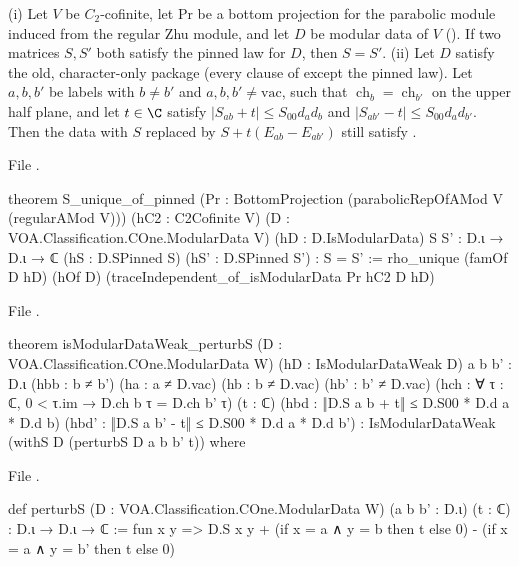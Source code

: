 \begin{theorem}\label{l21:thm:spin}
(i) Let $V$ be $C_2$-cofinite, let $\mathrm{Pr}$ be a bottom projection for the parabolic module induced from the
regular Zhu module, and let $D$ be modular data of $V$ (). If two matrices $S,S'$ both satisfy the
pinned law for $D$, then $S=S'$.
(ii) Let $D$ satisfy the old, character-only package  (every clause of 
except the pinned law). Let $a,b,b'$ be labels with $b\ne b'$ and $a,b,b'\ne\mathrm{vac}$, such that
$\operatorname{ch}_b=\operatorname{ch}_{b'}$ on the upper half plane, and let $t\in\C$ satisfy
$|S_{ab}+t|\le S_{00}d_ad_b$ and $|S_{ab'}-t|\le S_{00}d_ad_{b'}$. Then the data with $S$ replaced by
$S+t(E_{ab}-E_{ab'})$ still satisfy .
\end{theorem}
\noindent File .
\begin{leancode}
theorem S_unique_of_pinned
    (Pr : BottomProjection (parabolicRepOfAMod V (regularAMod V)))
    (hC2 : C2Cofinite V) (D : VOA.Classification.COne.ModularData V) (hD : D.IsModularData)
    {S S' : D.ι → D.ι → ℂ} (hS : D.SPinned S) (hS' : D.SPinned S') : S = S' :=
  rho_unique (famOf D hD) (hOf D) (traceIndependent_of_isModularData Pr hC2 D hD)
\end{leancode}
\noindent File .
\begin{leancode}
theorem isModularDataWeak_perturbS (D : VOA.Classification.COne.ModularData W) (hD : IsModularDataWeak D) {a b b' : D.ι}
    (hbb : b ≠ b') (ha : a ≠ D.vac) (hb : b ≠ D.vac) (hb' : b' ≠ D.vac)
    (hch : ∀ τ : ℂ, 0 < τ.im → D.ch b τ = D.ch b' τ) (t : ℂ)
    (hbd : ‖D.S a b + t‖ ≤ D.S00 * D.d a * D.d b)
    (hbd' : ‖D.S a b' - t‖ ≤ D.S00 * D.d a * D.d b') :
    IsModularDataWeak (withS D (perturbS D a b b' t)) where
\end{leancode}

\noindent File .
\begin{leancode}
def perturbS (D : VOA.Classification.COne.ModularData W) (a b b' : D.ι) (t : ℂ) : D.ι → D.ι → ℂ :=
  fun x y => D.S x y + (if x = a ∧ y = b then t else 0) - (if x = a ∧ y = b' then t else 0)
\end{leancode}


